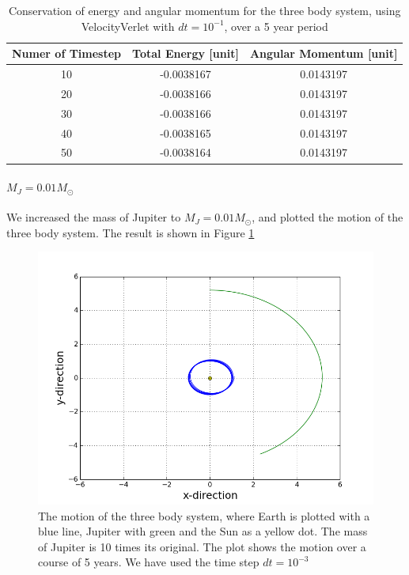 \documentclass[norsk,a4paper,12pt]{article}
\begin{document}
{\begin{table} [H]
\caption{Conservation of energy and angular momentum for the three body system, using VelocityVerlet with $dt=10^{-1}$, over a 5 year period}
\begin{tabular}{|c|c|c|} \hline
    {\bf Numer of Timestep} & {\bf Total Energy [unit]}& {\bf Angular Momentum [unit]}\\ \hline
    10 & -0.0038167 & 0.0143197\\ \hline
    20 & -0.0038166 & 0.0143197\\ \hline
    30 & -0.0038166 & 0.0143197\\ \hline
    40 & -0.0038165 & 0.0143197\\ \hline
    50 & -0.0038164 & 0.0143197\\ \hline 
\end{tabular}
\label{threebody_energy_dt=10(-1)}
\end{table}

\paragraph{\textbf{$M_J = 0.01M_{\odot}$}}

We increased the mass of Jupiter to $M_J = 0.01M_{\odot}$, and plotted the motion of the three body system. The result is shown in Figure \ref{fig:Jupiter_m=10^(-2)_Earth}

\begin{figure} [H]
    \centering
    \includegraphics[scale=0.6]{oppg_3e_threebody_Jupiter_m=10_(-2)_Earth}
    \caption{The motion of the three body system, where Earth is plotted with a blue line, Jupiter with green and the Sun as a yellow dot. The mass of Jupiter is 10 times its original. The plot shows the motion over a course of 5 years. We have used the time step $dt = 10^{-3}$}
    \label{fig:Jupiter_m=10^(-2)_Earth}
\end{figure}

}
\end{document}
